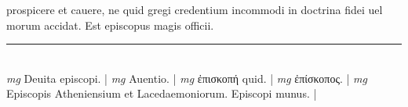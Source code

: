 \documentclass{article}
\begin{document}
\begin{pages}
prospicere et cauere, ne quid gregi credentium incommodi in doctrina fidei uel morum accidat. Est episcopus magis officii.  \pend
\vspace{0.5cm}\noindent
\vspace{0.2cm}\rule{1cm}{0.2pt}\\ 
\hspace{0.2cm}\textit{mg}
\footnotesize Deuita episcopi. 
\normalsize| 
\hspace{0.2cm}\textit{mg}
\footnotesize Auentio. 
\normalsize| 
\hspace{0.2cm}\textit{mg}
\footnotesize ἐπισκοπή quid. 
\normalsize| 
\hspace{0.2cm}\textit{mg}
\footnotesize ἐπίσκοπος. 
\normalsize| 
\hspace{0.2cm}\textit{mg}
\footnotesize Episcopis Atheniensium et Lacedaemoniorum. Episcopi munus. 
\normalsize| 

\end{pages}
\end{document}
